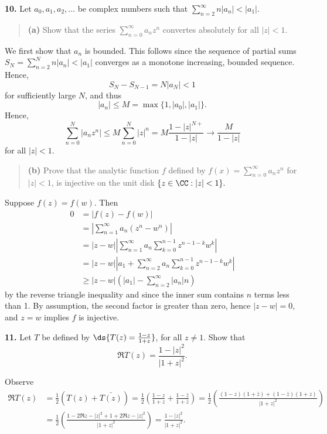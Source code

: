 \documentclass{homework}
\begin{document}
{\bf 10.} Let $a_0,a_1,a_2,\dots$ be complex numbers such that $\sum_{n=2}^\infty n|a_n| < |a_1|$.  
\begin{quote}
  {\bf (a)} Show that the series $\sum_{n=0}^\infty a_n z^n$ convertes absolutely for all $|z|<1$.
\end{quote}
\begin{solution}
  We first show that $a_n$ is bounded.  This follows since the sequence of partial sums $S_N = \sum_{n=2}^{N} n|a_n| < |a_1|$ converges as a monotone increasing, bounded sequence. Hence,
  $$
    S_N - S_{N-1} = N|a_N| < 1
  $$
  for sufficiently large $N$, and thus
  $$
    |a_n| \le M = \max\{1,|a_0|,|a_1|\}.
  $$
  Hence,
  $$
    \sum_{n=0}^N |a_n z^n| \le  M \sum_{n=0}^N|z|^n = M \frac{1-|z|^{N+}}{1-|z|} \to \frac{M}{1-|z|}
  $$
  for all $|z|<1$.
\end{solution}

\begin{quote}
  {\bf (b)} Prove that the analytic function $f$ defined by $f(x) = \sum_{n=0}^\infty a_n z^n$ for $|z|<1$, is injective on the unit disk $\{z\in \CC:|z|<1\}.$
\end{quote}
\begin{solution}
  Suppose $f(z) = f(w)$. Then 
  \begin{align*}
  0 
  &= |f(z) - f(w)| \\
  &= \left|\sum_{n=1}^\infty a_n(z^n - w^n)\right|\\
  &= |z-w|\left|\sum_{n=1}^\infty a_n \sum_{k=0}^{n-1}z^{n-1-k}w^k\right|\\
  &= |z-w|\left|a_1 + \sum_{n=2}^\infty  a_n \sum_{k=0}^{n-1}z^{n-1-k}w^k\right|\\
  &\ge |z-w|\left( |a_1| - \sum_{n=2}^\infty |a_n| n\right)
  \end{align*}
  by the reverse triangle inequality and since the inner sum contains $n$ terms less than 1.  By assumption, the second factor is greater than zero, hence $|z-w| = 0$, and $z=w$ implies $f$ is injective.
\end{solution}

{\bf 11.} Let $T$ be defined by $\ds{T(z) = \frac{1-z}{1+z}}$, for all $z\not=1$.  Show that
$$
  \Re T(z) = \frac{1-|z|^2}{|1+z|^2}.
$$

\begin{solution} 
  Observe
  \begin{align*}
    \Re T(z) 
    &= \frac 12\left(T(z) + \bar{T(z)}\right) = \frac 12\left(\frac{1-z}{1+z} + \frac{1-\bar z}{1+\bar z}\right) = \frac12\left(\frac{(1-z)(1+\bar z) + (1-\bar z)(1+z)}{|1+z|^2}\right)\\
    &=\frac 12\left(\frac{1-2\Re z - |z|^2 + 1+2\Re z - |z|^2}{|1+z|^2} \right) = \frac{1-|z|^2}{|1+z|^2}.
  \end{align*}
\end{solution}
\end{document}
